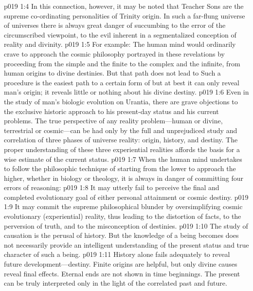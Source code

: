 \vs p019 1:4 In this connection, however, it may be noted that Teacher Sons are the supreme co\hyp{}ordinating personalities of Trinity origin. In such a far\hyp{}flung universe of universes there is always great danger of succumbing to the error of the circumscribed viewpoint, to the evil inherent in a segmentalized conception of reality and divinity.
\vs p019 1:5 For example: The human mind would ordinarily crave to approach the cosmic philosophy portrayed in these revelations by proceeding from the simple and the finite to the complex and the infinite, from human origins to divine destinies. But that path does not lead to  Such a procedure is the easiest path to a certain form of  but at best it can only reveal man’s origin; it reveals little or nothing about his divine destiny.
\vs p019 1:6 Even in the study of man’s biologic evolution on Urantia, there are grave objections to the exclusive historic approach to his present\hyp{}day status and his current problems. The true perspective of any reality problem---human or divine, terrestrial or cosmic---can be had only by the full and unprejudiced study and correlation of three phases of universe reality: origin, history, and destiny. The proper understanding of these three experiential realities affords the basis for a wise estimate of the current status.
\pc \vs p019 1:7 When the human mind undertakes to follow the philosophic technique of starting from the lower to approach the higher, whether in biology or theology, it is always in danger of committing four errors of reasoning:
\pc \vs p019 1:8 \bibnobreakspace It may utterly fail to perceive the final and completed evolutionary goal of either personal attainment or cosmic destiny.
\pc \vs p019 1:9 \bibnobreakspace It may commit the supreme philosophical blunder by oversimplifying cosmic evolutionary (experiential) reality, thus leading to the distortion of facts, to the perversion of truth, and to the misconception of destinies.
\pc \vs p019 1:10 \bibnobreakspace The study of causation is the perusal of history. But the knowledge of  a being becomes does not necessarily provide an intelligent understanding of the present status and true character of such a being.
\pc \vs p019 1:11 \bibnobreakspace History alone fails adequately to reveal future development---destiny. Finite origins are helpful, but only divine causes reveal final effects. Eternal ends are not shown in time beginnings. The present can be truly interpreted only in the light of the correlated past and future.
